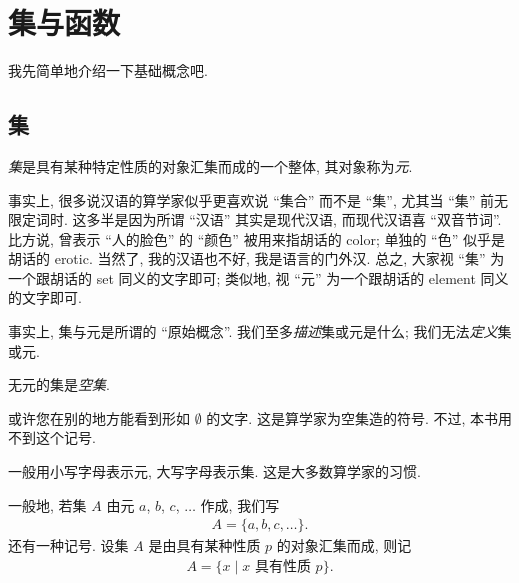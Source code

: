 \chapter{集与函数}

我先简单地介绍一下基础概念吧.

\section{集}

\begin{definition}
    \emph{集}是具有某种特定性质的对象汇集而成的一个整体, 其对象称为\emph{元}.
\end{definition}

\begin{remark}
    事实上, 很多说汉语的算学家似乎更喜欢说 ``集合'' 而不是 ``集'', 尤其当 ``集'' 前无限定词时. 这多半是因为所谓 ``汉语'' 其实是现代汉语, 而现代汉语喜 ``双音节词''. 比方说, 曾表示 ``人的脸色'' 的 ``颜色'' 被用来指胡话的 color; 单独的 ``色'' 似乎是胡话的 erotic. 当然了, 我的汉语也不好, 我是语言的门外汉. 总之, 大家视 ``集'' 为一个跟胡话的 set 同义的文字即可; 类似地, 视 ``元'' 为一个跟胡话的 element 同义的文字即可.
\end{remark}

\begin{remark}
    事实上, 集与元是所谓的 ``原始概念''. 我们至多\emph{描述}集或元是什么; 我们无法\emph{定义}集或元.
\end{remark}

\begin{definition}
    无元的集是\emph{空集}.
\end{definition}

\begin{remark}
    或许您在别的地方能看到形如 $\emptyset$ 的文字. 这是算学家为空集造的符号. 不过, 本书用不到这个记号.
\end{remark}

\begin{remark}
    一般用小写字母表示元, 大写字母表示集. 这是大多数算学家的习惯.
\end{remark}

\begin{definition}
    一般地, 若集 $A$ 由元 $a$, $b$, $c$, $\dots$ 作成, 我们写
    \begin{align*}
        A = \{ a,b,c,\dots \}.
    \end{align*}
    还有一种记号. 设集 $A$ 是由具有某种性质 $p$ 的对象汇集而成, 则记
    \begin{align*}
        A = \{ x \mid \text{$x$ 具有性质 $p$} \}.
    \end{align*}
\end{definition}

